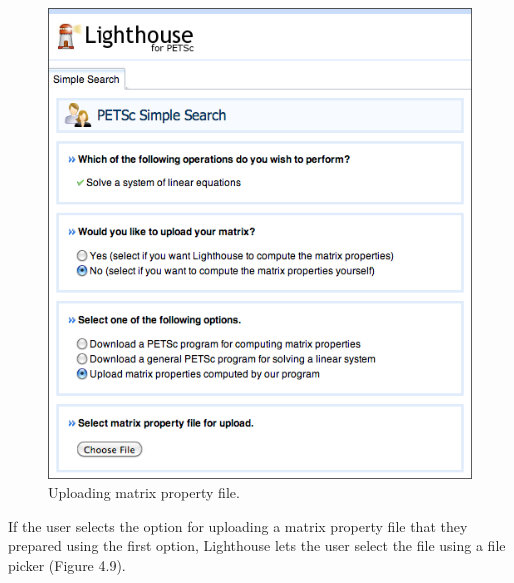 \begin{figure}[H]\label{petscui8}
  \centering
  \includegraphics[width=4.5in]{figs/petsc_8}
  \caption[Uploading matrix property file.]
   {Uploading matrix property file.}
\end{figure}

\noindent If the user selects the option for uploading a matrix property file that they prepared using the first option, Lighthouse lets the user select the file using a file picker (Figure 4.9). 

